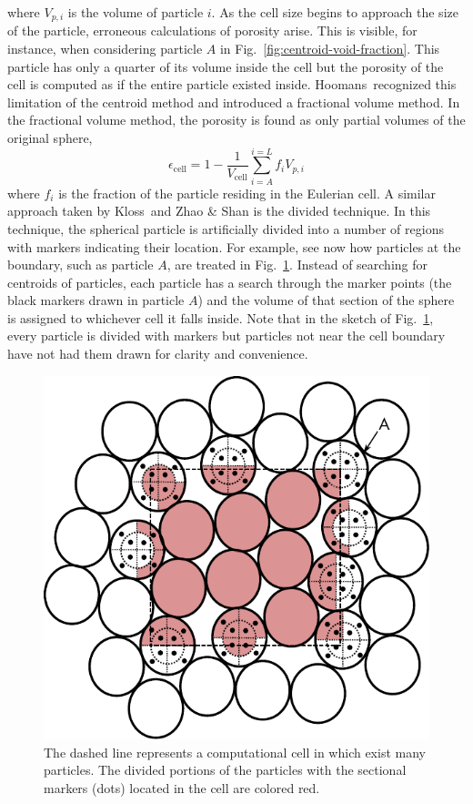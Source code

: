 where $V_{p,i}$ is the volume of particle $i$. As the cell size begins to approach the size of the particle, erroneous calculations of porosity arise. This is visible, for instance, when considering particle $A$ in Fig.~\ref{fig:centroid-void-fraction}. This particle has only a quarter of its volume inside the cell but the porosity of the cell is computed as if the entire particle existed inside. Hoomans\etal~recognized this limitation of the centroid method and introduced a fractional volume method.\cite{Hoomans1996} In the fractional volume method, the porosity is found as only partial volumes of the original sphere,
\begin{equation}
	\epsilon_\text{cell} = 1-\frac{1}{V_\text{cell}}\sum_{i = A}^{i=L}f_iV_{p,i}
\end{equation}
where $f_i$ is the fraction of the particle residing in the Eulerian cell. A similar approach taken by Kloss\etal~and Zhao \& Shan is the divided technique.\cite{Kloss2012,Zhao2013a} In this technique, the spherical particle is artificially divided into a number of regions with markers indicating their location. For example, see now how particles at the boundary, such as particle $A$, are treated in Fig.~\ref{fig:centroid-void-fraction-divided}. Instead of searching for centroids of particles, each particle has a search through the marker points (the black markers drawn in particle $A$) and the volume of that section of the sphere is assigned to whichever cell it falls inside. Note that in the sketch of Fig.~\ref{fig:centroid-void-fraction-divided}, every particle is divided with markers but particles not near the cell boundary have not had them drawn for clarity and convenience.
\begin{figure}[t]
	\centering
	\includegraphics[width=\singleimagewidth]{chapters/figures/void-fraction-divided-cell.pdf}
	\caption{The dashed line represents a computational cell in which exist many particles. The divided portions of the particles with the sectional markers (dots) located in the cell are colored red.}\label{fig:centroid-void-fraction-divided}
\end{figure}

